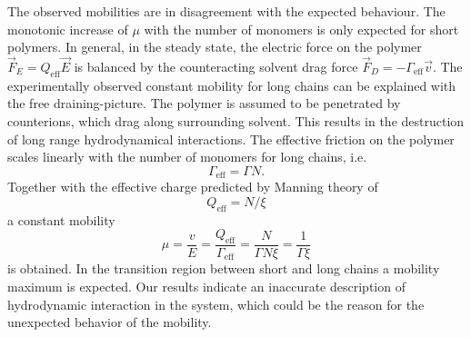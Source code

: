 The observed mobilities are in disagreement with the expected behaviour. The monotonic increase of $\mu$ with the number of monomers is only expected for short polymers. In general, in the steady state, the electric force on the polymer $\vec{F}_E = Q_\text{eff} \vec{E}$ is balanced by the counteracting solvent drag force $\vec{F}_D = -\Gamma_\text{eff} \vec{v}$. The experimentally observed constant mobility for long chains can be explained with the free draining-picture. The polymer is assumed to be penetrated by counterions, which drag along surrounding solvent. This results in the destruction of long range hydrodynamical interactions. The effective friction on the polymer scales linearly with the number of monomers for long chains, i.e.
\begin{equation}
	\Gamma_\text{eff} = \Gamma N.
\end{equation}
Together with the effective charge predicted by Manning theory of
\begin{equation}
	Q_\text{eff} = N / \xi
\end{equation}
a constant mobility
\begin{equation}
	\mu = \frac{v}{E} = \frac{Q_\text{eff}}{\Gamma_\text{eff}} = \frac{N}{\Gamma N \xi} = \frac{1}{\Gamma \xi}
\end{equation}
is obtained. In the transition region between short and long chains a mobility maximum is expected. Our results indicate an inaccurate description of hydrodynamic interaction in the system, which could be the reason for the unexpected behavior of the mobility.